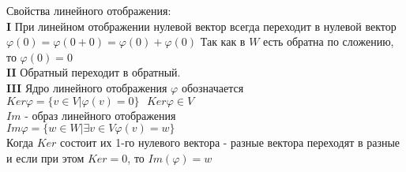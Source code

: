 Свойства линейного отображения:\\
{\bf I} При линейном отображении нулевой вектор всегда переходит в нулевой вектор
$\varphi(0) = \varphi(0+0) = \varphi(0) + \varphi(0)$ Так как в $W$ есть обратна
по сложению, то $\varphi(0) = 0$\\
{\bf II} Обратный переходит в обратный.\\
{\bf III} Ядро линейного отображения $\varphi$ обозначается $Ker \varphi =
\{v \in V | \varphi(v) = 0\} ~~~ Ker \varphi \in V$\\

$Im$ - образ линейного отображения\\
$Im \varphi = \{w \in W | \exists v \in V \varphi(v) = w\}$\\

Когда $Ker$ состоит их 1-го нулевого вектора - разные вектора переходят в разные
 и если при этом $Ker = {0}$, то $Im(\varphi) = w$\\

